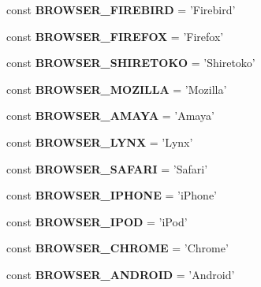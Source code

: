 \begin{DoxyCompactItemize}
\item 
\hypertarget{class_browser_af680f5f4122f19812bd4c8a73d2a5dbb}{
const {\bfseries BROWSER\_\-FIREBIRD} = 'Firebird'}
\label{class_browser_af680f5f4122f19812bd4c8a73d2a5dbb}

\item 
\hypertarget{class_browser_af46d869a45e477324f9596fe34d26952}{
const {\bfseries BROWSER\_\-FIREFOX} = 'Firefox'}
\label{class_browser_af46d869a45e477324f9596fe34d26952}

\item 
\hypertarget{class_browser_a5e518c845f15e24358fc3a2bb4402f4f}{
const {\bfseries BROWSER\_\-SHIRETOKO} = 'Shiretoko'}
\label{class_browser_a5e518c845f15e24358fc3a2bb4402f4f}

\item 
\hypertarget{class_browser_a264a1ce17c284ecd3456c7ff1e0c7a8e}{
const {\bfseries BROWSER\_\-MOZILLA} = 'Mozilla'}
\label{class_browser_a264a1ce17c284ecd3456c7ff1e0c7a8e}

\item 
\hypertarget{class_browser_a26c8fd4f8097ccdaabda8c09378e4816}{
const {\bfseries BROWSER\_\-AMAYA} = 'Amaya'}
\label{class_browser_a26c8fd4f8097ccdaabda8c09378e4816}

\item 
\hypertarget{class_browser_aa5396bd05a899d74409714775448d418}{
const {\bfseries BROWSER\_\-LYNX} = 'Lynx'}
\label{class_browser_aa5396bd05a899d74409714775448d418}

\item 
\hypertarget{class_browser_a720f4105d22a2d67d859a90f46fa19bb}{
const {\bfseries BROWSER\_\-SAFARI} = 'Safari'}
\label{class_browser_a720f4105d22a2d67d859a90f46fa19bb}

\item 
\hypertarget{class_browser_ad749bdfae5db1c138aeafa8fc6de629e}{
const {\bfseries BROWSER\_\-IPHONE} = 'iPhone'}
\label{class_browser_ad749bdfae5db1c138aeafa8fc6de629e}

\item 
\hypertarget{class_browser_adc8685fc510a597e33d35b49a8925a8b}{
const {\bfseries BROWSER\_\-IPOD} = 'iPod'}
\label{class_browser_adc8685fc510a597e33d35b49a8925a8b}

\item 
\hypertarget{class_browser_a22d125c2abafd241c968b2782546ee26}{
const {\bfseries BROWSER\_\-CHROME} = 'Chrome'}
\label{class_browser_a22d125c2abafd241c968b2782546ee26}

\item 
\hypertarget{class_browser_ab56d30f45d95304e800670ecc8d3d907}{
const {\bfseries BROWSER\_\-ANDROID} = 'Android'}
\label{class_browser_ab56d30f45d95304e800670ecc8d3d907}


\end{DoxyCompactItemize}
